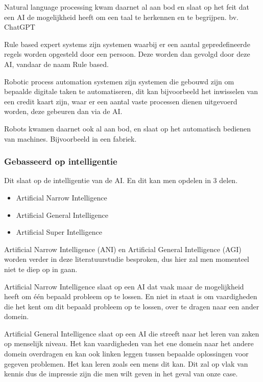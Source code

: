     Natural language processing kwam daarnet al aan bod en slaat op het feit dat een AI de mogelijkheid heeft om een taal te herkennen en te begrijpen. bv. ChatGPT
    
    Rule based expert systems zijn systemen waarbij er een aantal gepredefineerde regels worden opgesteld door een persoon. Deze worden dan gevolgd door deze AI, vandaar de naam Rule based.
    
    Robotic process automation systemen zijn systemen die gebouwd zijn om bepaalde digitale taken te automatiseren, dit kan bijvoorbeeld het inwisselen van een credit kaart zijn, waar er een aantal vaste processen dienen uitgevoerd worden, deze gebeuren dan via de AI.
    
    Robots kwamen daarnet ook al aan bod, en slaat op het automatisch bedienen van machines. Bijvoorbeeld in een fabriek.
    
\subsubsection{Gebasseerd op intelligentie}

    Dit slaat op de intelligentie van de AI. En dit kan men opdelen in 3 delen.
    \begin{itemize}
        \item Artificial Narrow Intelligence
        \item Artificial General Intelligence
        \item Artificial Super Intelligence
    \end{itemize}

    Artificial Narrow Intelligence (ANI) en Artificial General Intelligence (AGI) worden verder in deze literatuurstudie besproken, dus hier zal men momenteel niet te diep op in gaan. 
    
    Artificial Narrow Intelligence slaat op een AI dat vaak maar de mogelijkheid heeft om één bepaald probleem op te lossen. En niet in staat is om vaardigheden die het kent om dit bepaald probleem op te lossen, over te dragen naar een ander domein. 
    
    Artificial General Intelligence slaat op een AI die streeft naar het leren van zaken op menselijk niveau. Het kan vaardigheden van het ene domein naar het andere domein overdragen en kan ook linken leggen tussen bepaalde oplossingen voor gegeven problemen. Het kan leren zoals een mens dit kan. Dit zal op vlak van kennis dus de impressie zijn die men wilt geven in het geval van onze case.
    
